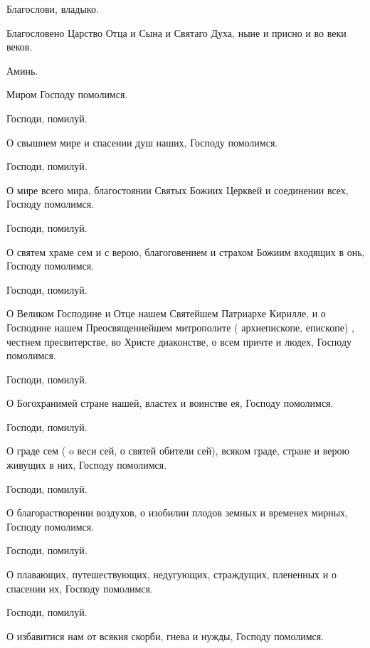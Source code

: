 \begin{mymulticols}

 Благослови, владыко.

 Благословено Царство Отца и Сына и Святаго Духа, ныне и присно и во веки веков. 

 Аминь.


 Миром Господу помолимся. 

 Господи, помилуй.

 О свышнем мире и спасении душ наших, Господу помолимся. 

 Господи, помилуй.

 О мире всего мира, благостоянии Святых Божиих Церквей и соединении всех, Господу помолимся.

 Господи, помилуй.

 О святем храме сем и с верою, благоговением и страхом Божиим входящих в онь, Господу помолимся. 

 Господи, помилуй.

 О Великом Господине и Отце нашем Святейшем Патриархе Кирилле, и о Господине нашем Преосвященнейшем митрополите (  архиепископе,  епископе) , честнем пресвитерстве, во Христе диаконстве, о всем причте и людех, Господу помолимся. 

 Господи, помилуй.

 О Богохранимей стране нашей, властех и воинстве ея, Господу помолимся.

 Господи, помилуй.

 О граде сем (  o веси сей,  о святей обители сей), всяком граде, стране и верою живущих в них, Господу помолимся. 

 Господи, помилуй.

 О благорастворении воздухов, о изобилии плодов земных и временех мирных, Господу помолимся.

 Господи, помилуй.

 О плавающих, путешествующих, недугующих, страждущих, плененных и о спасении их, Господу помолимся. 

 Господи, помилуй.

 О избавитися нам от всякия скорби, гнева и нужды, Господу помолимся. 


\end{mymulticols}
